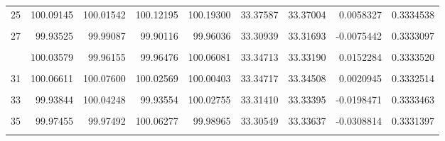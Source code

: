 \documentclass[a4paper]{tufte-handout}
\begin{document}
\begin{table}
{\begin{tabular}[t]{rrrrrrrrr}
25 & 100.09145 & 100.01542 & 100.12195 & 100.19300 & 33.37587 & 33.37004 & 0.0058327 & 0.3334538\\
\cellcolor{gray!6}{26} & \cellcolor{gray!6}{99.94882} & \cellcolor{gray!6}{99.96522} & \cellcolor{gray!6}{99.98467} & \cellcolor{gray!6}{99.90111} & \cellcolor{gray!6}{33.31360} & \cellcolor{gray!6}{33.31678} & \cellcolor{gray!6}{-0.0031763} & \cellcolor{gray!6}{0.3333066}\\
27 & 99.93525 & 99.99087 & 99.90116 & 99.96036 & 33.30939 & 33.31693 & -0.0075442 & 0.3333097\\
\cellcolor{gray!6}{28} & \cellcolor{gray!6}{100.03707} & \cellcolor{gray!6}{100.06852} & \cellcolor{gray!6}{99.91367} & \cellcolor{gray!6}{99.96827} & \cellcolor{gray!6}{33.32400} & \cellcolor{gray!6}{33.32783} & \cellcolor{gray!6}{-0.0038278} & \cellcolor{gray!6}{0.3331165}\\
\addlinespace
29 & 100.03579 & 99.96155 & 99.96476 & 100.06081 & 33.34713 & 33.33190 & 0.0152284 & 0.3333520\\
\cellcolor{gray!6}{30} & \cellcolor{gray!6}{100.10607} & \cellcolor{gray!6}{100.21994} & \cellcolor{gray!6}{100.18056} & \cellcolor{gray!6}{99.94590} & \cellcolor{gray!6}{33.37703} & \cellcolor{gray!6}{33.37182} & \cellcolor{gray!6}{0.0052115} & \cellcolor{gray!6}{0.3334167}\\
31 & 100.06611 & 100.07600 & 100.02569 & 100.00403 & 33.34717 & 33.34508 & 0.0020945 & 0.3332514\\
\cellcolor{gray!6}{32} & \cellcolor{gray!6}{100.02972} & \cellcolor{gray!6}{100.02388} & \cellcolor{gray!6}{100.01994} & \cellcolor{gray!6}{99.93302} & \cellcolor{gray!6}{33.31065} & \cellcolor{gray!6}{33.33076} & \cellcolor{gray!6}{-0.0201115} & \cellcolor{gray!6}{0.3330075}\\
33 & 99.93844 & 100.04248 & 99.93554 & 100.02755 & 33.31410 & 33.33395 & -0.0198471 & 0.3333463\\
\addlinespace
\cellcolor{gray!6}{34} & \cellcolor{gray!6}{100.12003} & \cellcolor{gray!6}{99.99567} & \cellcolor{gray!6}{100.06442} & \cellcolor{gray!6}{100.11670} & \cellcolor{gray!6}{33.33656} & \cellcolor{gray!6}{33.35298} & \cellcolor{gray!6}{-0.0164191} & \cellcolor{gray!6}{0.3329659}\\
35 & 99.97455 & 99.97492 & 100.06277 & 99.98965 & 33.30549 & 33.33637 & -0.0308814 & 0.3331397\\
\cellcolor{gray!6}{36} & \cellcolor{gray!6}{100.08121} & \cellcolor{gray!6}{100.14637} & \cellcolor{gray!6}{99.95326} & \cellcolor{gray!6}{100.18183} & \cellcolor{gray!6}{33.37774} & \cellcolor{gray!6}{33.36461} & \cellcolor{gray!6}{0.0131284} & \cellcolor{gray!6}{0.3335065}\\

\end{tabular}}
\end{table}
\end{document}
